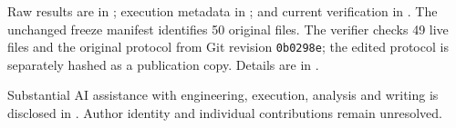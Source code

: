 \documentclass[11pt]{article}
\begin{document}
Raw results are in ; execution metadata in ; and current verification in . The unchanged freeze manifest identifies 50 original files. The verifier checks 49 live files and the original protocol from Git revision \texttt{0b0298e}; the edited protocol is separately hashed as a publication copy. Details are in .

Substantial AI assistance with engineering, execution, analysis and writing is disclosed in . Author identity and individual contributions remain unresolved.



\end{document}
